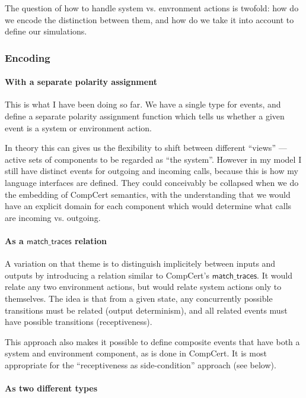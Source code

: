 \documentclass[11pt]{article}
\begin{document}
The question of how to handle system vs. envronment actions is twofold:
how do we encode the distinction between them, and
how do we take it into account to define our simulations.

\subsubsection{Encoding} %

\paragraph{With a separate polarity assignment}

This is what I have been doing so far.
We have a single type for events,
and define a separate polarity assignment function
which tells us whether a given event
is a system or environment action.

In theory this can gives us the flexibility to shift between
different ``views'' --- active sets of components to be regarded as ``the system''.
However in my model I still have distinct events
for outgoing and incoming calls,
because this is how my language interfaces are defined.
They could conceivably be collapsed
when we do the embedding of CompCert semantics,
with the understanding that we would have an explicit domain
for each component
which would determine what calls are incoming vs. outgoing.

\paragraph{As a $\mathsf{match\_traces}$ relation}

A variation on that theme is to
distinguish implicitely between inputs and outputs
by introducing a relation similar to CompCert's
$\mathsf{match\_traces}$.
It would relate any two environment actions,
but would relate system actions only to themselves.
The idea is that from a given state,
any concurrently possible transitions must be related
(output determinism),
and all related events must have possible transitions
(receptiveness).

This approach also makes it possible to define
composite events that have both a system and environment component,
as is done in CompCert.
It is most appropriate for the
``receptiveness as side-condition''
approach (see below).

\paragraph{As two different types}
\end{document}
